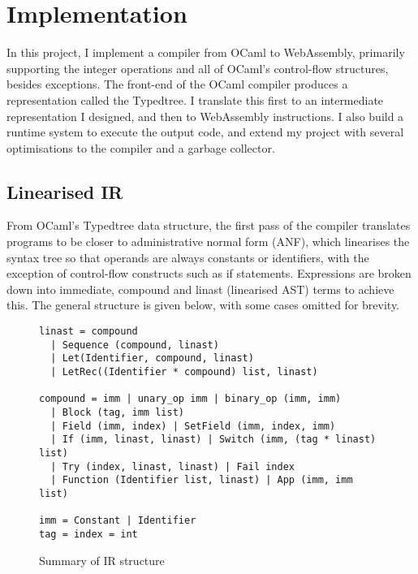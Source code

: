 \chapter{Implementation}

In this project, I implement a compiler from OCaml to WebAssembly, primarily supporting the integer operations and all of OCaml's control-flow structures, besides exceptions. The front-end of the OCaml compiler produces a representation called the Typedtree. I translate this first to an intermediate representation I designed, and then to WebAssembly instructions. I also build a runtime system to execute the output code, and extend my project with several optimisations to the compiler and a garbage collector.


\section{Linearised IR}
From OCaml's Typedtree data structure, the first pass of the compiler translates programs to be closer to administrative normal form (ANF), which linearises the syntax tree so that operands are always constants or identifiers, with the exception of control-flow constructs such as if statements. Expressions are broken down into immediate, compound and linast (linearised AST) terms to achieve this. The general structure is given below, with some cases omitted for brevity.

\begin{figure}[H]
\begin{verbatim}
linast = compound 
  | Sequence (compound, linast)
  | Let(Identifier, compound, linast) 
  | LetRec((Identifier * compound) list, linast)

compound = imm | unary_op imm | binary_op (imm, imm) 
  | Block (tag, imm list)
  | Field (imm, index) | SetField (imm, index, imm)
  | If (imm, linast, linast) | Switch (imm, (tag * linast) list)
  | Try (index, linast, linast) | Fail index
  | Function (Identifier list, linast) | App (imm, imm list)

imm = Constant | Identifier
tag = index = int
\end{verbatim}
\caption{Summary of IR structure}
\end{figure}

%

